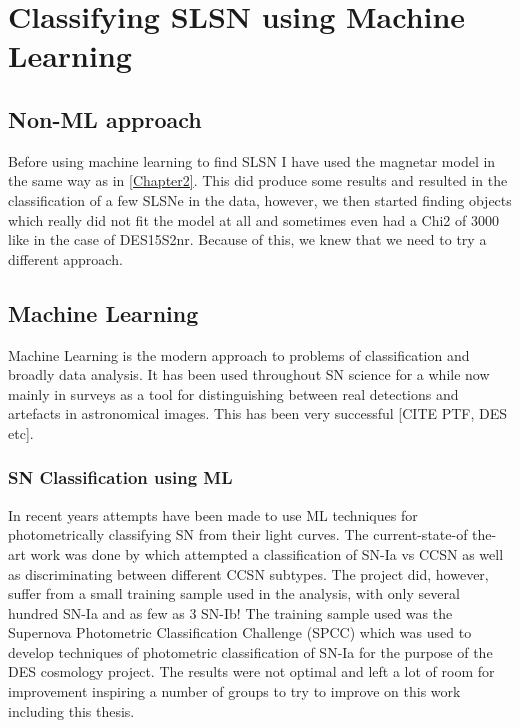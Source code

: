
\chapter{Classifying SLSN using Machine Learning} %
\label{Chapter5}

\section{Non-ML approach}
Before using machine learning to find SLSN I have used the magnetar model in the same way as in \cref{Chapter2}. This did produce some results and resulted in the classification of a few SLSNe in the data, however, we then started finding objects which really did not fit the model at all and sometimes even had a Chi2 of 3000 like in the case of DES15S2nr. Because of this, we knew that we need to try a different approach.

\section{Machine Learning}
Machine Learning is the modern approach to problems of classification and broadly data analysis. It has been used throughout SN science for a while now mainly in surveys as a tool for distinguishing between real detections and artefacts in astronomical images. This has been very successful [CITE PTF, DES etc].

\subsection{SN Classification using ML}
In recent years attempts have been made to use ML techniques for photometrically classifying SN from their light curves. The current-state-of the-art work was done by \citet{Lochner2016PHOTOMETRICLEARNING} which attempted a classification of SN-Ia vs CCSN as well as discriminating between different CCSN subtypes. The project did, however, suffer from a small training sample used in the analysis, with only several hundred SN-Ia and as few as 3 SN-Ib! The training sample used was the Supernova Photometric Classification Challenge (SPCC) \citep{Kessler2010} which was used to develop techniques of photometric classification of SN-Ia for the purpose of the DES cosmology project. The results were not optimal and left a lot of room for improvement inspiring a number of groups to try to improve on this work including this thesis.


